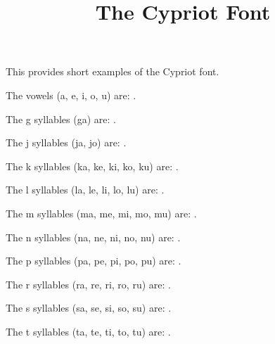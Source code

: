 \documentclass{article}
\title{The Cypriot Font}
\author{}
\date{}
\begin{document}
\maketitle

    This provides short examples of the Cypriot font.

    The vowels (a, e, i, o, u) are: .


    The g syllables (ga) are: .


    The j syllables (ja, jo) are: .


    The k syllables (ka, ke, ki, ko, ku) are: .


    The l syllables (la, le, li, lo, lu) are: .


    The m syllables (ma, me, mi, mo, mu) are: .


    The n syllables (na, ne, ni, no, nu) are: .


    The p syllables (pa, pe, pi, po, pu) are: .


    The r syllables (ra, re, ri, ro, ru) are: .


    The s syllables (sa, se, si, so, su) are: .


    The t syllables (ta, te, ti, to, tu) are: .
\end{document}
